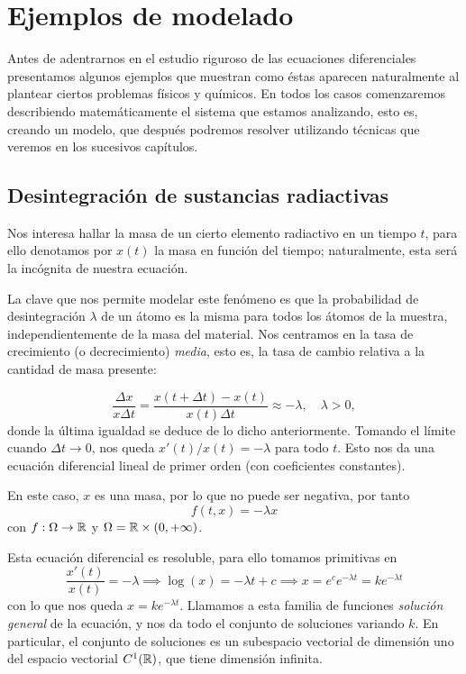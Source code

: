 \documentclass[../ecuaciones_diferenciales.tex]{subfiles}
\begin{document}
\section{Ejemplos de modelado}

Antes de adentrarnos en el estudio riguroso de las ecuaciones diferenciales
presentamos algunos ejemplos que muestran como éstas aparecen naturalmente al
plantear ciertos problemas físicos y químicos. En todos los casos comenzaremos
describiendo matemáticamente el sistema que estamos analizando, esto es, creando
un modelo, que después podremos resolver utilizando técnicas que veremos en los
sucesivos capítulos.

\subsection{Desintegración de sustancias radiactivas}

Nos interesa hallar la masa de un cierto elemento radiactivo en un tiempo \(t\),
para ello denotamos por \(x(t)\) la masa en función del tiempo; naturalmente,
esta será la incógnita de nuestra ecuación.

La clave que nos permite modelar este fenómeno es que la probabilidad de
desintegración \(\lambda\) de un átomo es la misma para todos los átomos de la
muestra, independientemente de la masa del material. Nos centramos en la tasa de
crecimiento (o decrecimiento) \emph{media}, esto es, la tasa de cambio relativa
a la cantidad de masa presente:

\[\frac{\Delta x}{x \Delta t} = \frac{x(t + \Delta t) - x(t)}{x(t) \Delta t}
	\approx -\lambda, \quad \lambda > 0,\]
donde la última igualdad se deduce de lo dicho anteriormente.
Tomando el límite cuando \(\Delta t \to 0\), nos queda \(x'(t)/x(t) = -\lambda\)
para todo \(t\). Esto nos da una ecuación diferencial lineal de primer orden
(con coeficientes constantes).

En este caso, \(x\) es una masa, por lo que no puede ser negativa, por tanto
\[f(t, x) = -\lambda x\]
con \(f : \Omega \to \mathbb{R}\) y \(\Omega = \mathbb{R} \times (0, +\infty)\).

Esta ecuación diferencial es resoluble, para ello tomamos primitivas en
\[\frac{x'(t)}{x(t)} = -\lambda \implies \log(x) = -\lambda t + c
	\implies x = e^c e^{-\lambda t} = k e^{-\lambda t}\] con lo que nos queda
\(x = k e^{-\lambda t}\). Llamamos a esta familia de funciones \emph{solución general}
de la ecuación, y nos da todo el conjunto de soluciones variando \(k\). En
particular, el conjunto de soluciones es un subespacio vectorial de dimensión
uno del espacio vectorial \(C^1(\mathbb{R})\), que tiene dimensión infinita.
\end{document}
